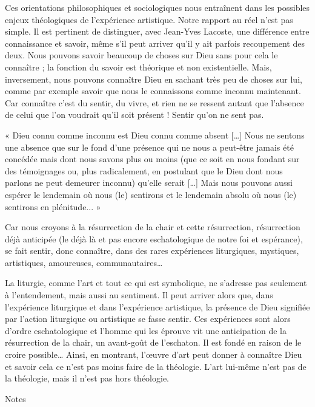 Ces orientations philosophiques et sociologiques nous entraînent dans les possibles enjeux théologiques de l’expérience artistique. Notre rapport au réel n’est pas simple. Il est pertinent de distinguer, avec Jean-Yves Lacoste, une différence entre connaissance et savoir, même s’il peut arriver qu’il y ait parfois recoupement des deux. Nous pouvons savoir beaucoup de choses sur Dieu sans pour cela le connaître ; la fonction du savoir est théorique et non existentielle. Mais, inversement, nous pouvons connaître Dieu en sachant très peu de choses sur lui, comme par exemple savoir que nous le connaissons comme inconnu maintenant. Car connaître c’est du sentir, du vivre, et rien ne se ressent autant que l’absence de celui que l’on voudrait qu’il soit présent ! Sentir qu’on ne sent pas.

\vspace{0.24cm}
{\footnotesize « Dieu connu comme inconnu est Dieu connu comme absent […] Nous ne 
sentons une absence que sur le fond d’une présence qui ne nous a peut-être jamais 
été concédée mais dont nous savons plus ou moins (que ce soit en nous fondant sur 
des témoignages ou, plus radicalement, en postulant que le Dieu dont nous parlons 
ne peut demeurer inconnu) qu’elle serait […] Mais nous pouvons aussi espérer le 
lendemain où nous (le) sentirons et le lendemain absolu où nous (le) sentirons en 
plénitude... »}
\vspace{0.31cm}

Car nous croyons à la résurrection de la chair et cette résurrection, résurrection déjà anticipée (le déjà là et pas encore eschatologique de notre foi et espérance), se fait sentir, donc connaître, dans des rares expériences liturgiques, mystiques, artistiques, amoureuses, communautaires…

La liturgie, comme l’art et tout ce qui est symbolique, ne s’adresse pas seulement à l’entendement, mais aussi au sentiment. Il peut arriver alors que, dans l’expérience liturgique et dans l’expérience artistique, la présence de Dieu signifiée par l’action liturgique ou artistique se fasse sentir. Ces expériences sont alors d’ordre eschatologique et l’homme qui les éprouve vit une anticipation de la résurrection de la chair, un avant-goût de l’eschaton. Il est fondé en raison de le croire possible… Ainsi, en montrant, l’œuvre d’art peut donner à connaître Dieu et savoir cela ce n’est pas moins faire de la théologie. L’art lui-même n’est pas de la théologie, mais il n’est pas hors théologie.

Notes

